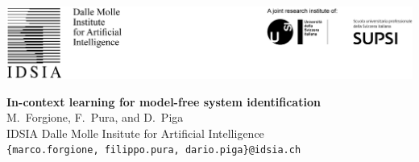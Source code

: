 \documentclass[a0,portrait]{a0poster}
\begin{document}


\begin{minipage}[ht!]{\linewidth}
  \includegraphics[width=\linewidth]{poster_top.png}
\end{minipage}

\vspace{2.0cm}

\begin{center}
\textbf{\bf\huge\color{structurecol}In-context learning for model-free system identification\\[1.0cm]}
\large M.~Forgione, F.~Pura, and D.~Piga\\[0.3cm]
\normalsize IDSIA Dalle Molle Insitute for Artificial Intelligence \\[0.3cm]
\small{\tt \{marco.forgione, filippo.pura, dario.piga\}@idsia.ch}
\end{center}
\end{document}
